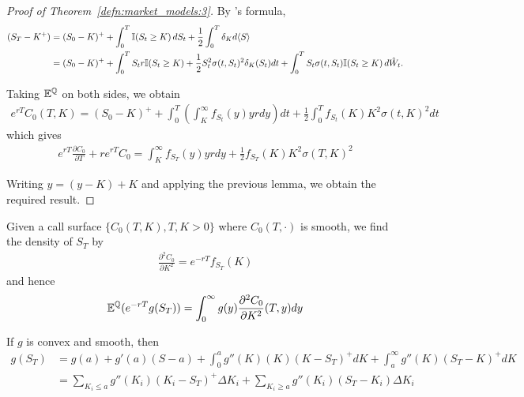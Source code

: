 \begin{proof}[Proof of Theorem~\ref{defn:market_models:3}]
  By \ito's formula,
  \begin{align}
    \label{eq:108}
    (S_{T} - K^{+}) &= (S_{0} - K)^{+} + \int_{0}^{T} \I{S_{t} \geq K}
    dS_{t} + \frac{1}{2} \int_{0}^{T} \delta_{K} d \IP{S} \\
    &= (S_{0} - K)^{+} + \int_{0}^{T} S_{t} r \I{S_{t} \geq K} +
    \frac{1}{2} S_{t}^{2} \sigma(t, S_{t})^{2} \delta_{K}(S_{t}) dt +
    \int_{0}^{T} S_{t} \sigma(t, S_{t}) \I{S_{t} \geq K} d\hat W_{t}.
  \end{align}

  Taking $\mathbb{E}^{\Q}$ on both sides, we obtain
  \begin{align}
    \label{eq:109}
    e^{rT}C_{0}(T, K) = (S_{0} - K)^{+} + \int_{0}^{T}
    (\int_{K}^{\infty} f_{S_{t}}(y) y r dy) dt + \frac{1}{2}
    \int_{0}^{T} f_{S_{t}}(K) K^{2} \sigma(t, K)^{2} dt
  \end{align} which gives
  \begin{align}
    \label{eq:110}
    e^{rT} \frac{\partial C_{0}}{\partial T} + re^{rT}C_{0} =
    \int_{K}^{\infty} f_{S_{T}}(y) y r dy + \frac{1}{2} f_{S_{T}}(K)
    K^{2} \sigma(T, K)^{2}
  \end{align}

  Writing $y = (y - K) + K$ and applying the previous lemma, we obtain
  the required result.
\end{proof}

\begin{remark}
  Given a call surface $\{ C_{0}(T, K), T, K > 0 \}$ where $C_{0}(T,
  \cdot)$ is smooth, we find the density of $S_{T}$ by
  \begin{align}
    \label{eq:111}
    \frac{\partial^{2} C_{0}}{\partial K^{2}} = e^{-rT} f_{S_{T}}(K)
  \end{align} and hence
  \begin{align}
    \label{eq:112}
    \mathbb{E}^{\Q}(e^{-rT} g(S_{T})) = \int_{0}^{\infty} g(y)
    \frac{\partial^{2} C_{0}}{\partial K^{2}}(T, y) dy
  \end{align}

  If $g$ is convex and smooth, then
  \begin{align}
    \label{eq:113}
    g(S_{T}) &= g(a) + g'(a)(S-a) + \int_{0}^{a} g''(K) (K) (K -
    S_{T})^{+} dK + \int_{a}^{\infty} g''(K) (S_{T} - K)^{+} dK \\
    &= \sum_{K_{i} \leq a} g''(K_{i})(K_{i} - S_{T})^{+} \Delta K_{i}
    + \sum_{K_{i} \geq a} g''(K_{i}) (S_{T} - K_{i}) \Delta K_{i}
  \end{align}
\end{remark}

